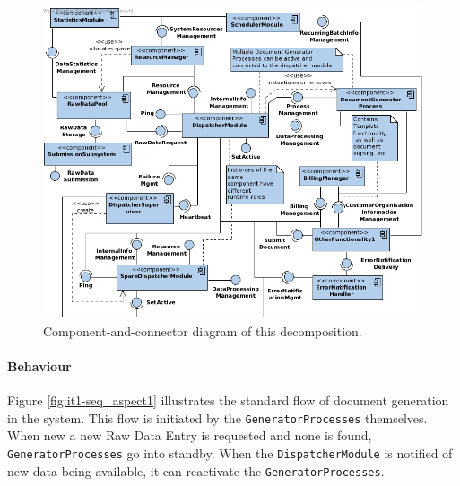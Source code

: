 \documentclass[a4paper,10pt]{article}
\begin{document}
\begin{figure}[!htp]
    \centering
    \includegraphics[width=\textwidth]{comp_diag_1.png}
    \caption{Component-and-connector diagram of this decomposition.}\label{fig:it1-cc_main}
\end{figure}

\paragraph{Behaviour}
Figure \ref{fig:it1-seq_aspect1} illustrates the standard flow of document generation in the system. This flow is initiated by the \texttt{GeneratorProcesses} themselves. When new a new Raw Data Entry is requested and none is found, \texttt{GeneratorProcesses} go into standby. When the \texttt{DispatcherModule} is notified of new data being available, it can reactivate the \texttt{GeneratorProcesses}.
\end{document}
